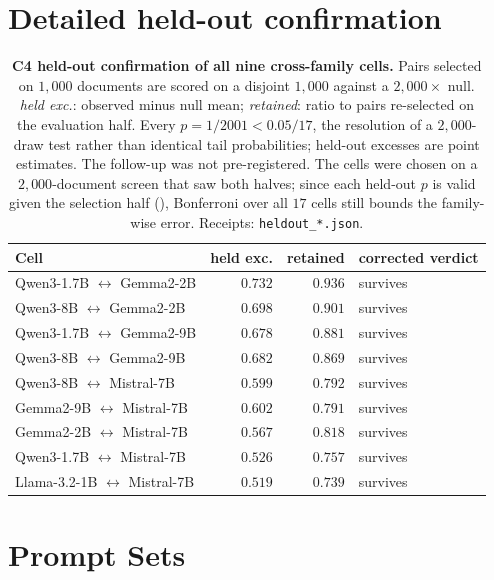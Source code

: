 \section{Detailed held-out confirmation}
\begin{table}[h]
\centering
\caption{\textbf{C4 held-out confirmation of all nine cross-family cells.} Pairs selected on
$1{,}000$ documents are scored on a disjoint $1{,}000$ against a $2{,}000\times$ null.
\emph{held exc.}: observed minus null mean; \emph{retained}: ratio to pairs re-selected on
the evaluation half. Every $p=1/2001<0.05/17$, the resolution of a $2{,}000$-draw test rather than identical tail probabilities; held-out excesses are point estimates. The follow-up was not pre-registered. The
cells were chosen on a $2{,}000$-document screen that saw both halves; since each held-out $p$ is
valid given the selection half (), Bonferroni over all $17$ cells still bounds
the family-wise error. Receipts: \texttt{heldout\_*.json}.}
\label{tab:c4_verdicts}
\scriptsize
\begin{tabular}{lrrl}
\toprule
Cell & held exc. & retained & corrected verdict \\
\midrule
Qwen3-1.7B $\leftrightarrow$ Gemma2-2B & $0.732$ & $0.936$ & survives \\
Qwen3-8B $\leftrightarrow$ Gemma2-2B & $0.698$ & $0.901$ & survives \\
Qwen3-1.7B $\leftrightarrow$ Gemma2-9B & $0.678$ & $0.881$ & survives \\
Qwen3-8B $\leftrightarrow$ Gemma2-9B & $0.682$ & $0.869$ & survives \\
Qwen3-8B $\leftrightarrow$ Mistral-7B & $0.599$ & $0.792$ & survives \\
Gemma2-9B $\leftrightarrow$ Mistral-7B & $0.602$ & $0.791$ & survives \\
Gemma2-2B $\leftrightarrow$ Mistral-7B & $0.567$ & $0.818$ & survives \\
Qwen3-1.7B $\leftrightarrow$ Mistral-7B & $0.526$ & $0.757$ & survives \\
Llama-3.2-1B $\leftrightarrow$ Mistral-7B & $0.519$ & $0.739$ & survives \\
\bottomrule
\end{tabular}
\end{table}
\section{Prompt Sets}\label{app:prompts}\label{app:setup}

